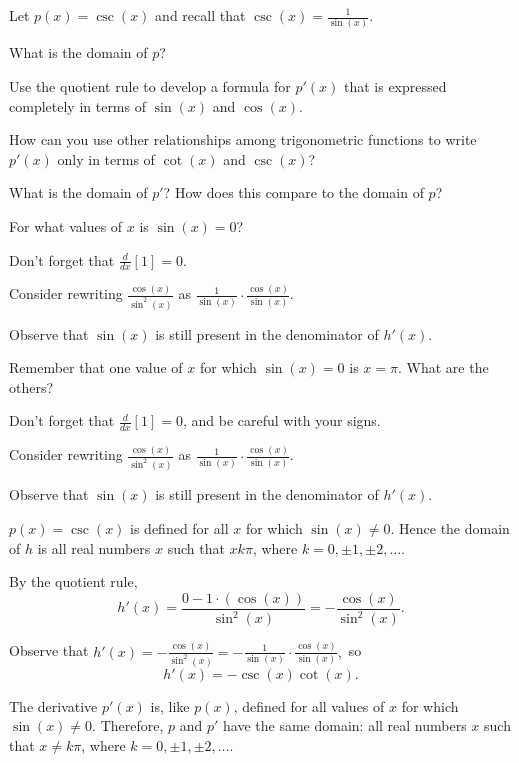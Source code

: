 \begin{activity} \label{A:2.4.2}  
Let $p(x) = \csc(x)$ and recall that $\csc(x) = \frac{1}{\sin(x)}$.
\ba
	\item What is the domain of $p$?
	\item Use the quotient rule to develop a formula for $p'(x)$ that is expressed completely in terms of $\sin(x)$ and $\cos(x)$.
	\item How can you use other relationships among trigonometric functions to write $p'(x)$ only in terms of $\cot(x)$ and $\csc(x)$?
	\item What is the domain of $p'$?  How does this compare to the domain of $p$? 
\ea
\end{activity}
\begin{smallhint}
\ba
	\item For what values of $x$ is $\sin(x) = 0$?
	\item Don't forget that $\frac{d}{dx}[1] = 0$.
	\item Consider rewriting $\frac{\cos(x)}{\sin^2(x)}$ as $\frac{1}{\sin(x)} \cdot \frac{\cos(x)}{\sin(x)}$.
	\item Observe that $\sin(x)$ is still present in the denominator of $h'(x)$. 
\ea
\end{smallhint}
\begin{bighint}
\ba
	\item Remember that one value of $x$ for which $\sin(x) = 0$ is $x = \pi$.  What are the others?
	\item Don't forget that $\frac{d}{dx}[1] = 0$, and be careful with your signs.
	\item Consider rewriting $\frac{\cos(x)}{\sin^2(x)}$ as $\frac{1}{\sin(x)} \cdot \frac{\cos(x)}{\sin(x)}$.
	\item Observe that $\sin(x)$ is still present in the denominator of $h'(x)$. 
\ea
\end{bighint}
\begin{activitySolution}
\ba
	\item $p(x) = \csc(x)$ is defined for all $x$ for which $\sin(x) \ne 0$.  Hence the domain of $h$ is all real numbers $x$ such that $x k\pi$, where $k = 0, \pm 1, \pm 2, \ldots$.
	\item By the quotient rule,
	$$h'(x) = \frac{0 - 1 \cdot (\cos(x))}{\sin^2(x)} = -\frac{\cos(x)}{\sin^2(x)}.$$
	\item Observe that $h'(x) = -\frac{\cos(x)}{\sin^2(x)} = -\frac{1}{\sin(x)} \cdot \frac{\cos(x)}{\sin(x)},$ so
	$$h'(x) = -\csc(x) \cot(x).$$
	\item The derivative $p'(x)$ is, like $p(x)$, defined for all values of $x$ for which $\sin(x) \ne 0$.  Therefore, $p$ and $p'$ have the same domain:  all real numbers $x$ such that $x \ne k\pi$, where $k = 0, \pm 1, \pm 2, \ldots$.
\ea
\end{activitySolution}
\aftera